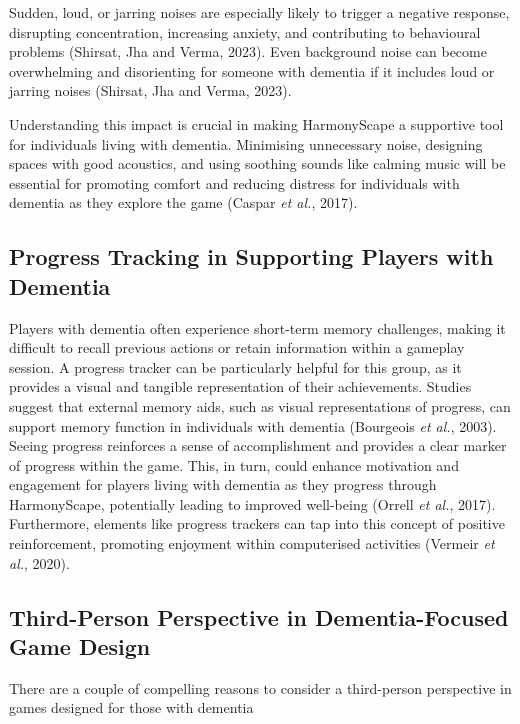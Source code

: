 \documentclass{l4proj}
\begin{document}
Sudden, loud, or jarring noises are especially likely to trigger a negative response, disrupting concentration, increasing anxiety, and contributing to behavioural problems (Shirsat, Jha and Verma, 2023). Even background noise can become overwhelming and disorienting for someone with dementia if it includes loud or jarring noises (Shirsat, Jha and Verma, 2023).

Understanding this impact is crucial in making HarmonyScape a supportive tool for individuals living with dementia. Minimising unnecessary noise, designing spaces with good acoustics, and using soothing sounds like calming music will be essential for promoting comfort and reducing distress for individuals with dementia as they explore the game (Caspar \emph{et al.}, 2017).

\subsection{Progress Tracking in Supporting Players with Dementia}\label{sec:progress_tracking}
Players with dementia often experience short-term memory challenges, making it difficult to recall previous actions or retain  information within a gameplay session. A progress tracker can be particularly helpful for this group, as it provides a visual and tangible representation of their achievements. Studies suggest that external memory aids, such as visual representations of progress, can support memory function in individuals with dementia (Bourgeois \emph{et al.}, 2003). Seeing progress reinforces a sense of accomplishment and  provides a clear marker of progress within the game. This, in turn, could enhance motivation and engagement for players living with dementia as they progress through HarmonyScape, potentially leading to improved well-being (Orrell \emph{et al.}, 2017). Furthermore, elements like progress trackers can tap into this concept of positive reinforcement, promoting enjoyment within computerised activities (Vermeir \emph{et al.}, 2020).

\subsection{Third-Person Perspective in Dementia-Focused Game Design}\label{sec:third_person}
There are a couple of compelling reasons to consider a third-person perspective in games designed for those with dementia
\end{document}
